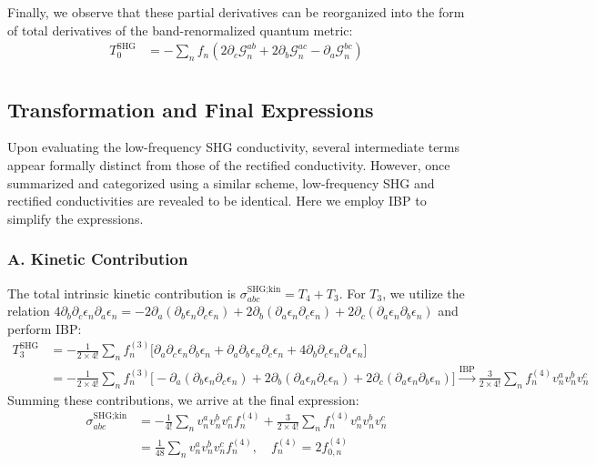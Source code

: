 \documentclass[twocolumn, prx, reprint, amsfonts, amsmath, amssymb, longbibliography, floatfix, aps]{revtex4-2}
\begin{document}
Finally, we observe that these partial derivatives can be reorganized into the form of total derivatives of the band-renormalized quantum metric:
\begin{equation}
	\begin{aligned}
		T^{\text{SHG}}_{0}
		&= -{\textstyle \sum_{n}} f_n (2\partial_c\mathcal{G}^{ab}_n + 2\partial_b\mathcal{G}^{ac}_n - \partial_a\mathcal{G}^{bc}_n)\\
	\end{aligned}
\end{equation}


\subsection{Transformation and Final Expressions}
Upon evaluating the low-frequency SHG conductivity, several intermediate terms appear formally distinct from those of the rectified conductivity. However, once summarized and categorized using a similar scheme, low-frequency SHG and rectified conductivities are revealed to be  identical. Here we employ IBP to simplify the expressions.

\subsubsection*{A. Kinetic Contribution}
The total intrinsic kinetic contribution is $\sigma^{\text{SHG}; \text{kin}}_{abc} = T_4 + T_3$. For $T_3$, we utilize the relation $4\partial_b\partial_c \epsilon_n \partial_a \epsilon_n = -2\partial_a(\partial_b \epsilon_n \partial_c \epsilon_n) + 2 \partial_b(\partial_a \epsilon_n \partial_c \epsilon_n) + 2\partial_c(\partial_a \epsilon_n \partial_b \epsilon_n) $ and perform IBP:
\begin{equation}
	\begin{aligned}
		T^{\text{SHG}}_3 &= -\frac{1}{2 \times 4!} {\textstyle \sum_{n}} f^{(3)}_n \Big[\partial_a\partial_c \epsilon_n \partial_b \epsilon_n + \partial_a\partial_b \epsilon_n \partial_c \epsilon_n + 4\partial_b\partial_c \epsilon_n \partial_a \epsilon_n\Big]
        \\
		&= -\frac{1}{2 \times 4!} {\textstyle \sum_{n}} f^{(3)}_n \Big[-\partial_a(\partial_b \epsilon_n \partial_c \epsilon_n) + 2 \partial_b(\partial_a \epsilon_n \partial_c \epsilon_n) + 2\partial_c(\partial_a \epsilon_n \partial_b \epsilon_n)\Big] \xrightarrow{\text{IBP}} \frac{3}{2 \times 4!} {\textstyle \sum_{n}} f^{(4)}_n v^a_n v^b_n v^c_n
	\end{aligned}
\end{equation}
Summing these contributions, we arrive at the final expression:
\begin{equation}
	\begin{aligned}
		\sigma^{\text{SHG}; \text{kin}}_{abc} &= -\frac{1}{4!} {\textstyle \sum_{n}} v^a_{n} v^{b}_{n}v^c_{n} f^{(4)}_n + \frac{3}{2 \times 4!} {\textstyle \sum_{n}} f^{(4)}_n v^a_n v^b_n v^c_n\\
		&= \frac{1}{48} {\textstyle \sum_{n}} v^a_{n} v^{b}_{n}v^c_{n} f^{(4)}_n,
        \quad
        f_n^{(4)} = 2 f_{0,n}^{(4)}
	\end{aligned}
\end{equation}
\end{document}
